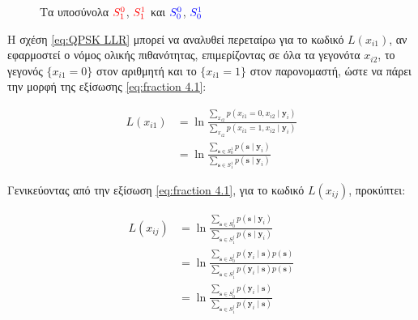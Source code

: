 \begin{figure}[H]
\caption{Τα υποσύνολα $ \color{red} {S}_1^0$, $ \color{red} {S}_1^1$ και $ \color{blue} {S}_0^0$, $ \color{blue}{S}_0^1$}
\label{fig:qpsk subtotals}
\end{figure}

Η σχέση \ref{eq:QPSK LLR} μπορεί να αναλυθεί περεταίρω για το κωδικό  $L(x_{i1})$, αν εφαρμοστεί ο νόμος ολικής πιθανότητας, επιμερίζοντας σε όλα τα γεγονότα $x_{i2}$, το γεγονός $\{x_{i1}=0\}$ στον αριθμητή και το $\{x_{i1}=1\}$ στον παρονομαστή, ώστε να πάρει την μορφή της εξίσωσης \ref{eq:fraction 4.1}:

\begin{equation}
\begin{split}
L(x_{i1}) & =\ln\frac{\sum\nolimits_{x_{i2}}p(x_{i1}=0, x_{i2}\mid\mathbf{y}_i)}{\sum\nolimits_{x_{i2}}p(x_{i1}=1, x_{i2}\mid\mathbf{y}_i)} \\
& = \ln\frac{\sum\nolimits_{\mathbf{s}\in{S}_0^1} p(\mathbf{s}\mid\mathbf{y}_i)}{\sum\nolimits_{\mathbf{s}\in{S}_1^1} p(\mathbf{s}\mid\mathbf{y}_i)}
\end{split}
\label{eq:fraction 4.1}
\end{equation}

Γενικεύοντας από την εξίσωση \ref{eq:fraction 4.1}, για το κωδικό  $L(x_{ij})$, προκύπτει:

\begin{equation}
\begin{split}
L(x_{ij}) & = \ln\frac{\sum\nolimits_{\mathbf{s}\in{S}_0^j} p(\mathbf{s}\mid\mathbf{y}_i)}{\sum\nolimits_{\mathbf{s}\in{S}_1^j} p(\mathbf{s}\mid\mathbf{y}_i)} \\
& = \ln\frac{\sum\nolimits_{\mathbf{s}\in{S}_0^j} p(\mathbf{y}_i\mid\mathbf{s})p(\mathbf{s})}{\sum\nolimits_{\mathbf{s}\in{S}_1^j} p(\mathbf{y}_i\mid\mathbf{s})p(\mathbf{s})} \\
& = \ln\frac{\sum\nolimits_{\mathbf{s}\in{S}_0^j} p(\mathbf{y}_i\mid\mathbf{s})}{\sum\nolimits_{\mathbf{s}\in{S}_1^j} p(\mathbf{y}_i\mid\mathbf{s})}
\end{split}
\label{eq:fraction 4.2}
\end{equation}

